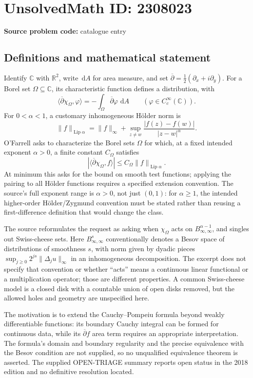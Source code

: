 \documentclass[11pt]{article}
\newcommand{\R}{\mathbb{R}}
\newcommand{\C}{\mathbb{C}}
\newcommand{\dd}{\,\mathrm{d}}
\begin{document}
\section*{UnsolvedMath ID: 2308023}
\textbf{Source problem code:} catalogue entry
\subsection{Definitions and mathematical statement}
Identify \(\C\) with \(\R^2\), write \(\dd A\) for area measure, and set \(\overline\partial=\tfrac12(\partial_x+i\partial_y)\). For a Borel set \(\Omega\subseteq\C\), its characteristic function defines a distribution, with
\[
\langle\overline\partial\chi_\Omega,\varphi\rangle
=-\int_\Omega\overline\partial\varphi\,\dd A
\qquad(\varphi\in C_c^\infty(\C)).
\]
For \(0<\alpha<1\), a customary inhomogeneous H\"older norm is
\[
\|f\|_{\operatorname{Lip}\alpha}
=\|f\|_\infty+
\sup_{z\ne w}\frac{|f(z)-f(w)|}{|z-w|^\alpha}.
\]
O'Farrell asks to characterize the Borel sets \(\Omega\) for which, at a fixed intended exponent \(\alpha>0\), a finite constant \(C_\Omega\) satisfies
\[
|\langle\overline\partial\chi_\Omega,f\rangle|
\le C_\Omega\|f\|_{\operatorname{Lip}\alpha}.
\]
At minimum this asks for the bound on smooth test functions; applying the pairing to all H\"older functions requires a specified extension convention. The source's full exponent range is \(\alpha>0\), not just \((0,1)\): for \(\alpha\ge1\), the intended higher-order H\"older/Zygmund convention must be stated rather than reusing a first-difference definition that would change the class.

The source reformulates the request as asking when \(\chi_\Omega\) acts on \(B^{\alpha-1}_{\infty,\infty}\), and singles out Swiss-cheese sets. Here \(B^s_{\infty,\infty}\) conventionally denotes a Besov space of distributions of smoothness \(s\), with norm given by dyadic pieces \(\sup_{j\ge0}2^{js}\|\Delta_j u\|_\infty\) in an inhomogeneous decomposition. The excerpt does not specify that convention or whether ``acts'' means a continuous linear functional or a multiplication operator; those are different properties. A common Swiss-cheese model is a closed disk with a countable union of open disks removed, but the allowed holes and geometry are unspecified here.

The motivation is to extend the Cauchy--Pompeiu formula beyond weakly differentiable functions: its boundary Cauchy integral can be formed for continuous data, while its \(\overline\partial f\) area term requires an appropriate interpretation. The formula's domain and boundary regularity and the precise equivalence with the Besov condition are not supplied, so no unqualified equivalence theorem is asserted. The supplied OPEN-TRIAGE summary reports open status in the 2018 edition and no definitive resolution located.
\end{document}
